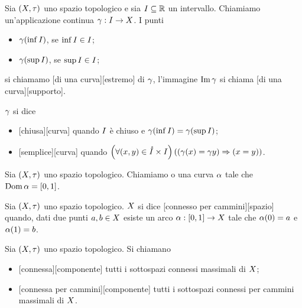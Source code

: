 \begin{Definition}
	Sia $(X,\tau)$ uno spazio topologico e sia
  $I \subseteq \mathbb{R}$ un intervallo.
  Chiamiamo
  un'applicazione continua
  $\gamma: I \rightarrow X$.
  I punti
  \begin{itemize}
    \item $\gamma(\inf I)$, se $\inf I \in I$;
    \item $\gamma(\sup I)$, se $\sup I \in I$;
  \end{itemize}
  si chiamamo
  [di una curva][estremo]
  di $\gamma$, l'immagine $\operatorname{Im}{\gamma}$ si chiama
  [di una curva][supporto].
  \par $\gamma$ si dice
  \begin{itemize}
    \item {}[chiusa][curva]
    quando $I$ \`e chiuso e
    $\gamma(\inf I) = \gamma(\sup I)$;
    \item {}[semplice][curva]
    quando
    $\left ( \forall (x,y) \in \mathring{I} \times I \right ) \left ( 
    \left ( \gamma(x) = \gamma{y} \right ) \Rightarrow \left ( x = y \right ) \right )$.
  \end{itemize}
\end{Definition}
\begin{Definition}
	Sia $(X,\tau)$ uno spazio topologico.
  Chiamiamo
  o
  una curva $\alpha$ tale che $\operatorname{Dom}{\alpha} = [0,1]$.
\end{Definition}
\begin{Definition}
	Sia $(X,\tau)$ uno spazio topologico.
	$X$ si dice
	[connesso per cammini][spazio]
  quando,
	dati due punti $a, b \in X$ esiste un arco
	$\alpha: [0,1] \rightarrow X$ tale
	che $\alpha(0) = a$ e $\alpha(1) = b$.
\end{Definition}
\begin{Definition}
	Sia $(X,\tau)$ uno spazio topologico.
	Si chiamano
	\begin{itemize}
		\item {}[connessa][componente]
		 tutti i sottospazi connessi massimali di
		$X$;
		\item {}[connessa per cammini][componente]
		tutti i sottospazi connessi per cammini massimali di
		$X$.
	\end{itemize}
\end{Definition}
